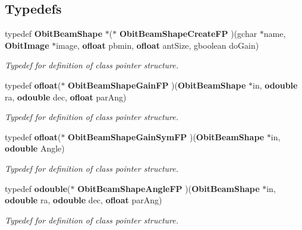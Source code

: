 \subsection*{Typedefs}
\begin{CompactItemize}
\item 
typedef {\bf Obit\-Beam\-Shape} $\ast$($\ast$ {\bf Obit\-Beam\-Shape\-Create\-FP} )(gchar $\ast$name, {\bf Obit\-Image} $\ast$image, {\bf ofloat} pbmin, {\bf ofloat} ant\-Size, gboolean do\-Gain)
\begin{CompactList}\small\item\em Typedef for definition of class pointer structure. \item\end{CompactList}\item 
typedef {\bf ofloat}($\ast$ {\bf Obit\-Beam\-Shape\-Gain\-FP} )({\bf Obit\-Beam\-Shape} $\ast$in, {\bf odouble} ra, {\bf odouble} dec, {\bf ofloat} par\-Ang)
\begin{CompactList}\small\item\em Typedef for definition of class pointer structure. \item\end{CompactList}\item 
typedef {\bf ofloat}($\ast$ {\bf Obit\-Beam\-Shape\-Gain\-Sym\-FP} )({\bf Obit\-Beam\-Shape} $\ast$in, {\bf odouble} Angle)
\begin{CompactList}\small\item\em Typedef for definition of class pointer structure. \item\end{CompactList}\item 
typedef {\bf odouble}($\ast$ {\bf Obit\-Beam\-Shape\-Angle\-FP} )({\bf Obit\-Beam\-Shape} $\ast$in, {\bf odouble} ra, {\bf odouble} dec, {\bf ofloat} par\-Ang)
\begin{CompactList}\small\item\em Typedef for definition of class pointer structure. \item\end{CompactList}\end{CompactItemize}
